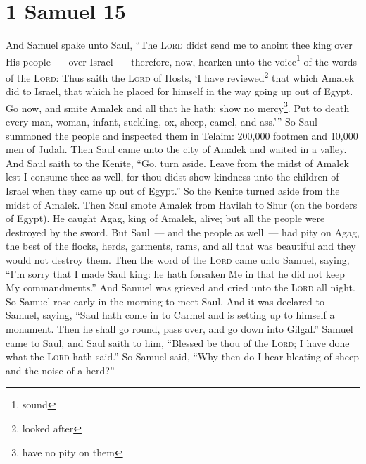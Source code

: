 \section{1 Samuel 15}\label{1 Samuel 15}
\begin{enumerate}[align=center]
     And Samuel spake unto Saul, ``The \textsc{Lord} didst send me to anoint thee king over His people~--- over Israel~--- therefore, now, hearken unto the voice\footnote{sound} of the words of the \textsc{Lord}:%
     Thus saith the \textsc{Lord} of Hosts, `I have reviewed\footnote{looked after} that which Amalek did to Israel, that which he placed for himself in the way going up out of Egypt.%
     Go now, and smite Amalek and all that he hath; show no mercy\footnote{have no pity on them}. Put to death every man, woman, infant, suckling, ox, sheep, camel, and ass.'''%
     So Saul summoned the people and inspected them in Telaim: 200,000 footmen and 10,000 men of Judah.%
     Then Saul came unto the city of Amalek and waited in a valley.%
     And Saul saith to the Kenite, ``Go, turn aside. Leave from the midst of Amalek lest I consume thee as well, for thou didst show kindness unto the children of Israel when they came up out of Egypt.'' So the Kenite turned aside from the midst of Amalek.%
     Then Saul smote Amalek from Havilah to Shur (on the borders of Egypt).%
     He caught Agag, king of Amalek, alive; but all the people were destroyed by the sword.%
     But Saul~--- and the people as well~--- had pity on Agag, the best of the flocks, herds, garments, rams, and all that was beautiful and they would not destroy them.%
     Then the word of the \textsc{Lord} came unto Samuel, saying,%
     ``I'm sorry that I made Saul king: he hath forsaken Me in that he did not keep My commandments.'' And Samuel was grieved and cried unto the \textsc{Lord} all night.%
     So Samuel rose early in the morning to meet Saul. And it was declared to Samuel, saying, ``Saul hath come in to Carmel and is setting up to himself a monument. Then he shall go round, pass over, and go down into Gilgal.''%
     Samuel came to Saul, and Saul saith to him, ``Blessed be thou of the \textsc{Lord}; I have done what the \textsc{Lord} hath said.''%
     So Samuel said, ``Why then do I hear bleating of sheep and the noise of a herd?''%

\end{enumerate}
